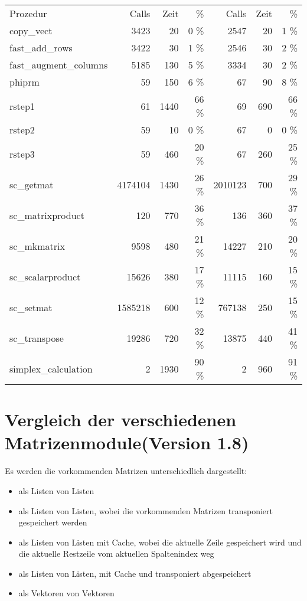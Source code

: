 \documentclass[a4paper]{article}
\begin{document}
\begin{tabular}{l|rrr|rrr}
Prozedur & Calls & Zeit & \% & Calls & Zeit & \% \\
copy\_vect & 3423 & 20 & 0 \% & 2547 & 20 & 1 \% \\
fast\_add\_rows & 3422 & 30 & 1 \% & 2546 & 30 & 2 \% \\
fast\_augment\_columns & 5185 & 130 & 5 \% & 3334 & 30 & 2 \% \\
phiprm & 59 & 150 & 6 \% & 67 & 90 & 8 \% \\
rstep1 & 61 & 1440 & 66 \% & 69 & 690 & 66 \% \\
rstep2 & 59 & 10 & 0 \% & 67 & 0 & 0 \% \\
rstep3 & 59 & 460 & 20 \% & 67 & 260 & 25 \% \\
sc\_getmat & 4174104 & 1430 & 26 \% & 2010123 & 700 & 29 \% \\
sc\_matrixproduct & 120 & 770 & 36 \% & 136 & 360 & 37 \% \\
sc\_mkmatrix & 9598 & 480 & 21 \% & 14227 & 210 & 20 \% \\
sc\_scalarproduct & 15626 & 380 & 17 \% & 11115 & 160 & 15 \% \\
sc\_setmat & 1585218 & 600 & 12 \% & 767138 & 250 & 15 \% \\
sc\_transpose & 19286 & 720 & 32 \% & 13875 & 440 & 41 \% \\
simplex\_calculation & 2 & 1930 & 90 \% & 2 & 960 & 91 \% \\
\end{tabular}

\newpage

\section{Vergleich der verschiedenen Matrizenmodule(Version 1.8)}

Es werden die vorkommenden Matrizen unterschiedlich dargestellt:
\begin{itemize}
\item als Listen von Listen
\item als Listen von Listen, wobei die vorkommenden Matrizen transponiert
	gespeichert werden
\item als Listen von Listen mit Cache, wobei die aktuelle Zeile gespeichert 
 	wird und die aktuelle Restzeile vom aktuellen Spaltenindex weg
\item als Listen von Listen, mit Cache und transponiert abgespeichert
\item als Vektoren von Vektoren
\end{itemize}
\end{document}
